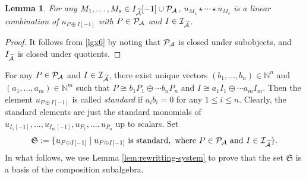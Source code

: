 \documentclass[reqno,12pt]{amsart}
\numberwithin{equation}{section}
\theoremstyle{plain} %
\newtheorem{lemma}[theorem]{\bf Lemma}
\theoremstyle{definition} %
\begin{document}
\begin{lemma}\label{lem:monomial-to-special-monomial}
    For any $M_1,\ldots, M_s\in I_{\widetilde{\mathcal{A}}}[-1]\cup \mathcal{P}_{\mathcal{A}}$, $u_{M_1}\star \cdots\star u_{M_s}$ is a linear combination of $u_{P\oplus I[-1]}$ with $P\in \mathcal{P}_{\mathcal{A}}$ and $I\in \mathcal{I}_{\widetilde{\mathcal{A}}}$.
\end{lemma}
\begin{proof}
   It follows from \eqref{lgx6} by noting that $\mathcal {P}_{\mathcal{A}}$ is closed under subobjects, and $I_{\widetilde{\mathcal{A}}}$ is closed under quotients.
\end{proof}


For any $P\in \mathcal{P}_{\mathcal{A}}$ and $I\in \mathcal{I}_{\widetilde{\mathcal{A}}}$, there exist unique vectors $(b_1,\ldots,b_n)\in \mathbb{N}^n$ and $(a_1,\ldots, a_m)\in \mathbb{N}^m$ such that
$P\cong b_1P_1\oplus \cdots b_nP_n$ and $I\cong a_1I_1\oplus \cdots a_mI_m.$
Then the element $u_{P\oplus I[-1]}$ is called {\em standard} if $a_ib_i=0$ for any $1\leq i\leq n$.
Clearly, the standard elements are just the standard monomials of $u_{I_1[-1]},\ldots, u_{I_m[-1]}, u_{P_1},\ldots, u_{P_n}$ up to scalars. Set $$\mathfrak{S}:=\{u_{P\oplus I[-1]}\mid \text{$u_{P\oplus I[-1]}$ is standard},~\text{where}~P\in \mathcal{P}_{\mathcal{A}}~\text{and}~I\in \mathcal{I}_{\widetilde{\mathcal{A}}}\}.$$
In what follows, we use Lemma \ref{lem:rewritting-system} to prove that the set $\mathfrak{S}$ is a basis of the composition subalgebra.
\end{document}
